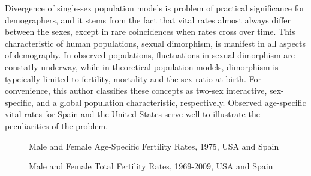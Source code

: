 

Divergence of single-sex population models is problem of practical significance
for demographers, and it stems from the fact that vital rates almost always
differ between the sexes, except in rare coincidences when rates cross over
time. This characteristic of human populations, sexual dimorphism,
is manifest in all aspects of demography. In observed populations, fluctuations
in sexual dimorphism are constatly underway, while in theoretical population
models, dimorphism is typcically limited to fertility, mortality and the sex
ratio at birth. For convenience, this author classifies these concepts as
two-sex interactive, sex-specific, and a global population characteristic, 
respectively. Observed age-specific vital rates for Spain and the United States
serve well to illustrate the peculiarities of the problem.  %

\begin{figure}[ht!]
        \centering  
          \caption{Male and Female Age-Specific Fertility Rates, 1975, USA and
          Spain}
          \label{fig:ASFR1975}
\end{figure}


\begin{figure}[ht!]
        \centering  
          \caption{Male and Female Total Fertility Rates, 1969-2009, USA and
          Spain}
          \label{fig:TFRseries}
\end{figure}






 









